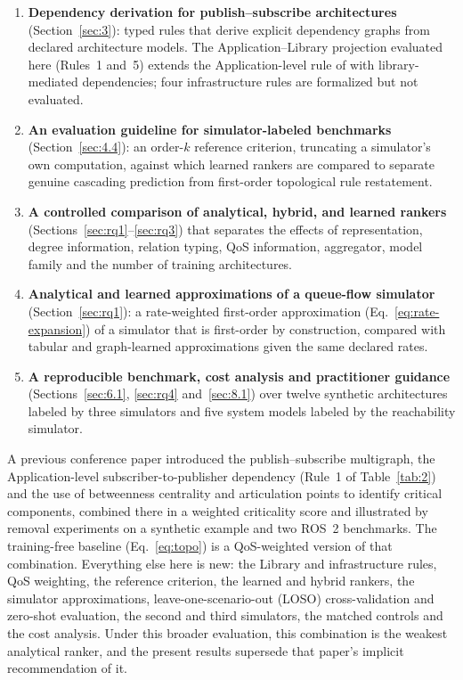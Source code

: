 \documentclass[preprint,3p]{elsarticle}
\providecommand{\tightlist}{%
  \setlength{\itemsep}{0pt}\setlength{\parskip}{0pt}}
\begin{document}
\begin{enumerate}\tightlist
    \item \textbf{Dependency derivation for publish--subscribe architectures} (Section~\ref{sec:3}): typed rules that derive explicit dependency graphs from declared architecture models. The Application--Library projection evaluated here (Rules~1 and~5) extends the Application-level rule of \cite{yigit2025graph} with library-mediated dependencies; four infrastructure rules are formalized but not evaluated.
    \item \textbf{An evaluation guideline for simulator-labeled benchmarks} (Section~\ref{sec:4.4}): an order-$k$ reference criterion, truncating a simulator's own computation, against which learned rankers are compared to separate genuine cascading prediction from first-order topological rule restatement.
    \item \textbf{A controlled comparison of analytical, hybrid, and learned rankers} (Sections~\ref{sec:rq1}--\ref{sec:rq3}) that separates the effects of representation, degree information, relation typing, QoS information, aggregator, model family and the number of training architectures.
    \item \textbf{Analytical and learned approximations of a queue-flow simulator} (Section~\ref{sec:rq1}): a rate-weighted first-order approximation (Eq.~\eqref{eq:rate-expansion}) of a simulator that is first-order by construction, compared with tabular and graph-learned approximations given the same declared rates.
    \item \textbf{A reproducible benchmark, cost analysis and practitioner guidance} (Sections~\ref{sec:6.1}, \ref{sec:rq4} and~\ref{sec:8.1}) over twelve synthetic architectures labeled by three simulators and five system models labeled by the reachability simulator.
\end{enumerate}

A previous conference paper \cite{yigit2025graph} introduced the publish--subscribe multigraph, the Application-level subscriber-to-publisher dependency (Rule~1 of Table~\ref{tab:2}) and the use of betweenness centrality and articulation points to identify critical components, combined there in a weighted criticality score and illustrated by removal experiments on a synthetic example and two ROS~2 benchmarks. The training-free baseline (Eq.~\eqref{eq:topo}) is a QoS-weighted version of that combination. Everything else here is new: the Library and infrastructure rules, QoS weighting, the reference criterion, the learned and hybrid rankers, the simulator approximations, leave-one-scenario-out (LOSO) cross-validation and zero-shot evaluation, the second and third simulators, the matched controls and the cost analysis. Under this broader evaluation, this combination is the weakest analytical ranker, and the present results supersede that paper's implicit recommendation of it.
\end{document}
